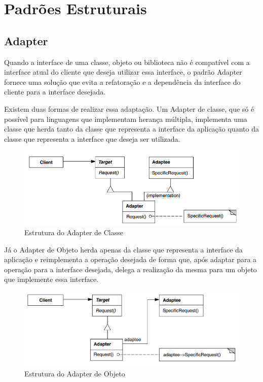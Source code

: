 \chapter{Padrões Estruturais}

\section{Adapter}

Quando a interface de uma classe, objeto ou biblioteca não 
é compatível com a interface atual do cliente que deseja 
utilizar essa interface, o padrão Adapter fornece uma 
solução que evita a refatoração e a dependência da interface 
do cliente para a interface desejada.

Existem duas formas de realizar essa adaptação. Um Adapter 
de classe, que só é possível para linguagens que implementam 
herança múltipla, implementa uma classe que herda tanto da 
classe que representa a interface da aplicação quanto da 
classe que representa a interface que deseja ser utilizada. 

\begin{figure}[htb]
	\caption{\label{fig_grafico}Estrutura do Adapter de Classe}
	\begin{center}
	    \includegraphics[scale=0.5]{5_padroes-contexto-funcional/5.2_estruturais/5.2.1_adapter/diagram2.png}
	\end{center}
\end{figure}

Já o Adapter de Objeto herda apenas da classe que representa 
a interface da aplicação e reimplementa a operação desejada 
de forma que, após adaptar para a operação para a interface 
desejada, delega a realização da mesma para um objeto que 
implemente essa interface.

\begin{figure}[htb]
	\caption{\label{fig_grafico}Estrutura do Adapter de Objeto}
	\begin{center}
	    \includegraphics[scale=0.5]{5_padroes-contexto-funcional/5.2_estruturais/5.2.1_adapter/diagram.png}
	\end{center}
\end{figure}

